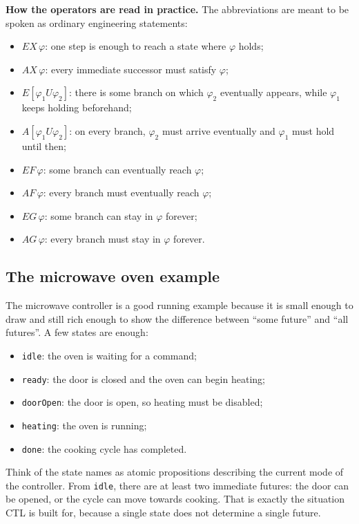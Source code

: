 \medskip\noindent
\textbf{How the operators are read in practice.}  The abbreviations are meant
to be spoken as ordinary engineering statements:
\begin{itemize}
  \item $EX\,\varphi$: one step is enough to reach a state where $\varphi$
        holds;
  \item $AX\,\varphi$: every immediate successor must satisfy $\varphi$;
  \item $E[\varphi_1 U \varphi_2]$: there is some branch on which $\varphi_2$
        eventually appears, while $\varphi_1$ keeps holding beforehand;
  \item $A[\varphi_1 U \varphi_2]$: on every branch, $\varphi_2$ must arrive
        eventually and $\varphi_1$ must hold until then;
  \item $EF\,\varphi$: some branch can eventually reach $\varphi$;
  \item $AF\,\varphi$: every branch must eventually reach $\varphi$;
  \item $EG\,\varphi$: some branch can stay in $\varphi$ forever;
  \item $AG\,\varphi$: every branch must stay in $\varphi$ forever.
\end{itemize}

\subsection{The microwave oven example}

The microwave controller is a good running example because it is small enough
to draw and still rich enough to show the difference between ``some future''
and ``all futures''.  A few states are enough:
\begin{itemize}
  \item \texttt{idle}: the oven is waiting for a command;
  \item \texttt{ready}: the door is closed and the oven can begin heating;
  \item \texttt{doorOpen}: the door is open, so heating must be disabled;
  \item \texttt{heating}: the oven is running;
  \item \texttt{done}: the cooking cycle has completed.
\end{itemize}

Think of the state names as atomic propositions describing the current mode of
the controller.  From \texttt{idle}, there are at least two immediate
futures: the door can be opened, or the cycle can move towards cooking.
That is exactly the situation CTL is built for, because a single state does
not determine a single future.

